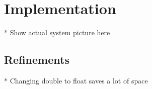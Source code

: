 \section{Implementation}
* Show actual system picture here
\subsection{Refinements}
* Changing double to float saves a lot of space